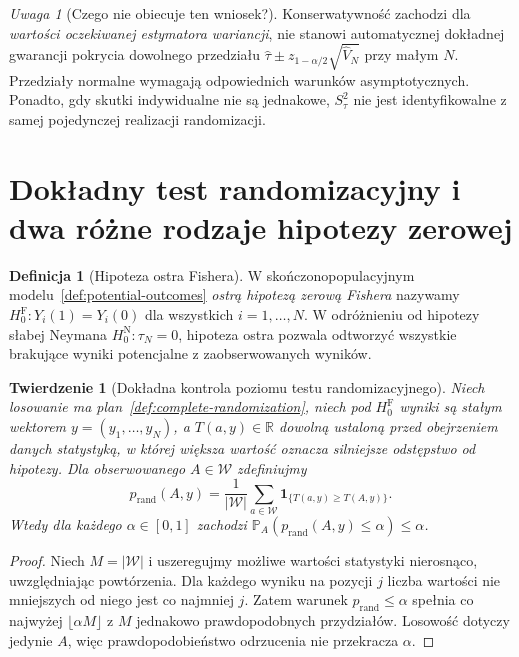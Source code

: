 \documentclass[11pt,a4paper,oneside]{report}
\numberwithin{equation}{chapter}
\theoremstyle{plain}
\newtheorem{twierdzenie}{Twierdzenie}[chapter]
\theoremstyle{definition}
\newtheorem{definicja}{Definicja}[chapter]
\theoremstyle{remark}
\newtheorem{uwaga}{Uwaga}[chapter]
\newcommand{\R}{\mathbb R}
\newcommand{\Prob}{\mathbb P}
\begin{document}
\begin{uwaga}[Czego nie obiecuje ten wniosek?]
Konserwatywność zachodzi dla \emph{wartości oczekiwanej estymatora wariancji}, nie stanowi automatycznej dokładnej gwarancji pokrycia dowolnego przedziału $\widehat\tau\pm z_{1-\alpha/2}\sqrt{\widehat V_N}$ przy małym $N$. Przedziały normalne wymagają odpowiednich warunków asymptotycznych. Ponadto, gdy skutki indywidualne nie są jednakowe, $S_\tau^2$ nie jest identyfikowalne z samej pojedynczej realizacji randomizacji.
\end{uwaga}

\section{Dokładny test randomizacyjny i dwa różne rodzaje hipotezy zerowej}
\begin{definicja}[Hipoteza ostra Fishera]\label{def:fisher-sharp}
W skończonopopulacyjnym modelu~\ref{def:potential-outcomes} \emph{ostrą hipotezą zerową Fishera} nazywamy $H_0^{\mathrm F}:Y_i(1)=Y_i(0)$ dla wszystkich $i=1,\ldots,N$. W odróżnieniu od hipotezy słabej Neymana $H_0^{\mathrm N}:\tau_N=0$, hipoteza ostra pozwala odtworzyć wszystkie brakujące wyniki potencjalne z zaobserwowanych wyników.
\end{definicja}

\begin{twierdzenie}[Dokładna kontrola poziomu testu randomizacyjnego]\label{thm:fisher-exact}
Niech losowanie ma plan~\ref{def:complete-randomization}, niech pod $H_0^{\mathrm F}$ wyniki są stałym wektorem $y=(y_1,\ldots,y_N)$, a $T(a,y)\in\R$ dowolną ustaloną przed obejrzeniem danych statystyką, w której większa wartość oznacza silniejsze odstępstwo od hipotezy. Dla obserwowanego $A\in\mathcal W$ zdefiniujmy
\[
 p_{\mathrm{rand}}(A,y)=\frac1{|\mathcal W|}\sum_{a\in\mathcal W}\mathbf 1_{\{T(a,y)\ge T(A,y)\}}.
\]
Wtedy dla każdego $\alpha\in[0,1]$ zachodzi $\Prob_A(p_{\mathrm{rand}}(A,y)\le\alpha)\le\alpha$.
\end{twierdzenie}
\begin{proof}
Niech $M=|\mathcal W|$ i uszeregujmy możliwe wartości statystyki nierosnąco, uwzględniając powtórzenia. Dla każdego wyniku na pozycji $j$ liczba wartości nie mniejszych od niego jest co najmniej $j$. Zatem warunek $p_{\mathrm{rand}}\le\alpha$ spełnia co najwyżej $\lfloor\alpha M\rfloor$ z $M$ jednakowo prawdopodobnych przydziałów. Losowość dotyczy jedynie $A$, więc prawdopodobieństwo odrzucenia nie przekracza $\alpha$.
\end{proof}
\end{document}
